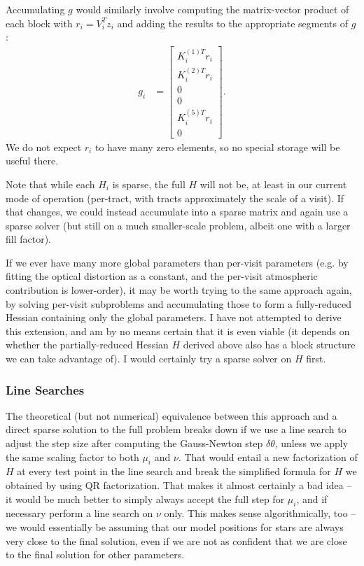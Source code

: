 Accumulating $g$ would similarly involve computing the matrix-vector product of each block with $r_i = V_i^T z_i$ and adding the results to the appropriate segments of $g$:
\begin{align}
    g_i &= \left[
        \begin{array}{ c }
            K_i^{(1) T} r_i \\
            K_i^{(2) T} r_i \\
            0 \\
            0 \\
            K_i^{(5) T} r_i \\
            0
        \end{array}
    \right].
\end{align}
We do not expect $r_i$ to have many zero elements, so no special storage will be useful there.

Note that while each $H_i$ is sparse, the full $H$ will not be, at least in our current mode of operation (per-tract, with tracts approximately the scale of a visit).
If that changes, we could instead accumulate into a sparse matrix and again use a sparse solver (but still on a much smaller-scale problem, albeit one with a larger fill factor).

If we ever have many more global parameters than per-visit parameters (e.g. by fitting the optical distortion as a constant, and the per-visit atmospheric contribution is lower-order), it may be worth trying to the same approach again, by solving per-visit subproblems and accumulating those to form a fully-reduced Hessian containing only the global parameters.
I have not attempted to derive this extension, and am by no means certain that it is even viable (it depends on whether the partially-reduced Hessian $H$ derived above also has a block structure we can take advantage of).
I would certainly try a sparse solver on $H$ first.

\subsubsection{Line Searches}

The theoretical (but not numerical) equivalence between this approach and a direct sparse solution to the full problem breaks down if we use a line search to adjust the step size after computing the Gauss-Newton step $\delta\theta$, unless we apply the same scaling factor to both $\mu_i$ and $\nu$.
That would entail a new factorization of $H$ at every test point in the line search and break the simplified formula for $H$ we obtained by using QR factorization.
That makes it almost certainly a bad idea -- it would be much better to simply always accept the full step for $\mu_i$, and if necessary perform a line search on $\nu$ only.
This makes sense algorithmically, too -- we would essentially be assuming that our model positions for stars are always very close to the final solution, even if we are not as confident that we are close to the final solution for other parameters.

